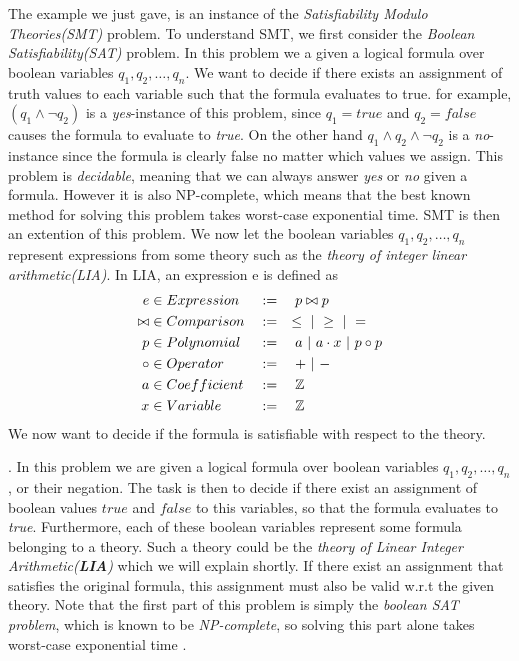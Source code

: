 	The example we just gave, is an instance of the \emph{Satisfiability Modulo Theories(SMT)} problem. To understand SMT, we first consider the \emph{Boolean Satisfiability(SAT)} problem. In this problem we a given a logical formula over boolean variables $q_1, q_2, \ldots, q_n$. We want to decide if there exists an assignment of truth values to each variable such that the formula evaluates to true. for example, $(q_1 \land \neg q_2)$ is a \emph{yes}-instance of this problem, since $q_1 = true$ and $q_2 = false$ causes the formula to evaluate to \emph{true}. On the other hand $q_1 \land q_2 \land \neg q_2$ is a \emph{no}-instance since the formula is clearly false no matter which values we assign. This problem is \emph{decidable}, meaning that we can always answer \emph{yes} or \emph{no} given a formula. However it is also NP-complete, which means that the best known method for solving this problem takes worst-case exponential time. SMT is then an extention of this problem. We now let the boolean variables $q_1, q_2, \ldots, q_n$ represent expressions from some theory such as the \emph{theory of integer linear arithmetic(LIA)}. In LIA, an expression e is defined as 
		\begin{alignat*}{3}
			e & \in Expression && := \quad p \bowtie p\\
			\bowtie & \in Comparison && := \quad \leq \ | \  \geq \ | \  =\\
			p & \in Polynomial && := \quad a \ | \  a\cdot x \ | \  p \circ p\\
			\circ & \in Operator && := \quad + \ | \  - \\
			a & \in Coefficient && := \quad \mathbb{Z}\\
			x & \in Variable && := \quad \mathbb{Z}			
		\end{alignat*} 
	We now want to decide if the formula is satisfiable with respect to the theory.
	
	\iffalse. In this problem we are given a logical formula over boolean variables $q_1, q_2, \ldots, q_n$, or their negation. The task is then to decide if there exist an assignment of boolean values $true$ and $false$ to this variables, so that the formula evaluates to \emph{true}. Furthermore, each of these boolean variables represent some formula belonging to a theory. Such a theory could be the \emph{theory of Linear Integer Arithmetic(\textbf{LIA})} which we will explain shortly. If there exist an assignment that satisfies the original formula, this assignment must also be valid w.r.t the given theory. Note that the first part of this problem is simply the \emph{boolean SAT problem}, which is known to be \emph{NP-complete}, so solving this part alone takes worst-case exponential time \cite{DeMoura2011}.
	
